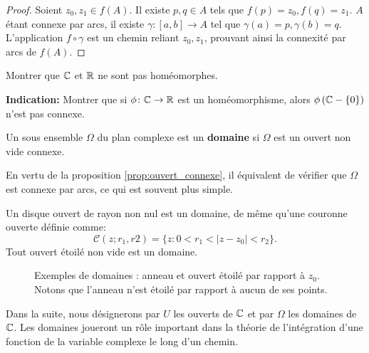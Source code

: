 \begin{proof}
Soient $z_0,z_1 \in f(A)$. Il existe $p,q \in A$ tels que $f(p) =z_0, f(q)=z_1$. $A$ étant connexe par arcs, il existe $\gamma \colon [a,b] \to A$ tel que $\gamma(a) = p, \gamma(b) = q$. L'application $f \circ \gamma$ est un chemin reliant $z_0,z_1$, prouvant ainsi la connexité par arcs de $f(A)$.
\end{proof}
\begin{exercice}
    Montrer que $\mathbb{C}$ et $\mathbb R$ ne sont pas homéomorphes. 
    
    \textbf{Indication:} Montrer que si $\phi \colon \mathbb{C} \to \mathbb R$ est un homéomorphisme, alors $\phi\left(\mathbb{C}-\{0\}\right)$ n'est pas connexe.    
\end{exercice}
\begin{fdefn} Un sous ensemble $\Omega$ du plan complexe est un \textbf{domaine} si $\Omega$ est un ouvert non vide connexe. 
\end{fdefn}
\begin{rem}
En vertu de la proposition \ref{prop:ouvert_connexe}, il équivalent de vérifier que $\Omega$ est connexe par arcs, ce qui est souvent plus simple.
\end{rem}

Un disque ouvert de rayon non nul est un domaine, de même qu'une couronne ouverte définie comme:
\[
\mathcal{C}(z;r_1,r2) =  \{ z : 0<r_1 <\lvert z-z_0 \rvert <r_2\}. 
 \]
 Tout ouvert étoilé non vide est un domaine.


\begin{figure}[H]
\begin{center}
\shorthandoff{!}\shorthandoff{:}
\shorthandon{!}\shorthandoff{:}
\caption{Exemples de domaines : anneau et ouvert étoilé par rapport à $z_0$. Notons que l'anneau n'est étoilé par rapport à aucun de ses points.}\label{fig:domaines}
\end{center}
\end{figure}
 Dans la suite, nous désignerons par $U$ les ouverts de $\mathbb{C}$ et par $\Omega$ les domaines de $\mathbb{C}$. Les domaines joueront un rôle important dans la théorie de l'intégration d'une fonction de la variable complexe le long d'un chemin.



